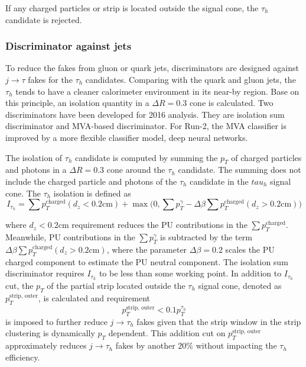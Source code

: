 \noindent If any charged particles or strip is located outside the signal cone, the $\tau_h$ candidate is rejected.

\subsubsection{Discriminator against jets}

To reduce the fakes from gluon or quark jets, 
discriminators are designed against $j\to \tau$ fakes for the $\tau_h$ candidates. Comparing with the quark and gluon jets, the $\tau_h$ tends to have a cleaner calorimeter environment in its near-by region. Base on this principle, an isolation quantity in a $\Delta R = 0.3$ cone is calculated. Two discriminators have been developed for 2016 analysis. They are isolation sum discriminator and MVA-based discriminator. For Run-2, the MVA classifier is improved by a more flexible classifier model, deep neural networks. 

The isolation of $\tau_h$ candidate is computed by summing the $p_T$ of charged particles and photons in a $\Delta R = 0.3$ cone around the $\tau_h$ candidate. The summing does not include the charged particle and photons of the $\tau_h$ candidate in the $tau_h$ signal cone. The $\tau_h$ isolation is defined as
\begin{equation}
	I_{\tau_h} = \sum p_T^{\text{charged}} (d_z<0.2 \text{cm}) + \max \bigg( 0, \sum p_T^ \gamma - \Delta \beta \sum p_T^{\text{charged}} (d_z>0.2 \text{cm})  \bigg )
    \label{eqn:cmsexperiment:reconstruction:tauIso}
\end{equation}

\noindent where $d_z<0.2 \text{cm}$ requirement reduces the PU contributions in the $\sum p_T^{\text{charged}}$. Meanwhile, PU contributions in the $\sum p_T^ \gamma $ is subtracted by the term $\Delta \beta \sum p_T^{\text{charged}} (d_z>0.2 \text{cm}) $, where the parameter $\Delta \beta =0.2$ scales the PU charged component to estimate the PU neutral component. The isolation sum discriminator requires $I_{\tau_h} $ to be less than some working point. In addition to $I_{\tau_h}$ cut, the $p_T$ of the partial strip located outside the $\tau_h$ signal cone, denoted as $p_T^{\text{strip, outer}} $, is calculated and requirement
\begin{equation}
p_T^{\text{strip, outer}} < 0.1 p_T^{\tau_h}
\end{equation}
\noindent is imposed to further reduce $j \to \tau_h$ fakes given that the strip window in the strip clustering is dynamically $p_T$ dependent. This addition cut on $p_T^{\text{strip, outer}}$ approximately reduces $j \to \tau_h$ fakes by another $20\%$ without impacting the $\tau_h$ efficiency.


